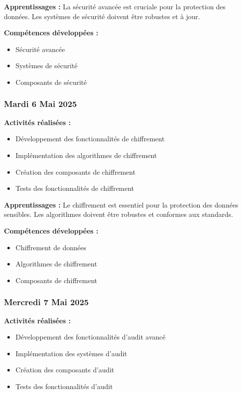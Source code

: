 \documentclass[12pt,a4paper]{article}
\begin{document}
\textbf{Apprentissages :}
La sécurité avancée est cruciale pour la protection des données. Les systèmes de sécurité doivent être robustes et à jour.

\textbf{Compétences développées :}
\begin{itemize}
    \item Sécurité avancée
    \item Systèmes de sécurité
    \item Composants de sécurité
\end{itemize}

\subsubsection{Mardi 6 Mai 2025}
\textbf{Activités réalisées :}
\begin{itemize}
    \item Développement des fonctionnalités de chiffrement
    \item Implémentation des algorithmes de chiffrement
    \item Création des composants de chiffrement
    \item Tests des fonctionnalités de chiffrement
\end{itemize}

\textbf{Apprentissages :}
Le chiffrement est essentiel pour la protection des données sensibles. Les algorithmes doivent être robustes et conformes aux standards.

\textbf{Compétences développées :}
\begin{itemize}
    \item Chiffrement de données
    \item Algorithmes de chiffrement
    \item Composants de chiffrement
\end{itemize}

\subsubsection{Mercredi 7 Mai 2025}
\textbf{Activités réalisées :}
\begin{itemize}
    \item Développement des fonctionnalités d'audit avancé
    \item Implémentation des systèmes d'audit
    \item Création des composants d'audit
    \item Tests des fonctionnalités d'audit
\end{itemize}
\end{document}
